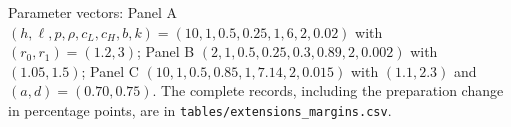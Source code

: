 \begin{landscape}
\begin{table}[tbp]
\begin{threeparttable}
\begin{tablenotes}
\item Parameter vectors: Panel A $(h,\ell,p,\rho,c_L,c_H,b,k)=(10,1,0.5,0.25,1,6,2,0.02)$ with $(r_0,r_1)=(1.2,3)$; Panel B $(2,1,0.5,0.25,0.3,0.89,2,0.002)$ with $(1.05,1.5)$; Panel C $(10,1,0.5,0.85,1,7.14,2,0.015)$ with $(1.1,2.3)$ and $(a,d)=(0.70,0.75)$. The complete records, including the preparation change in percentage points, are in \texttt{tables/extensions\_margins.csv}.
\end{tablenotes}
\end{threeparttable}
\par\endgroup\end{table}
\end{landscape}
